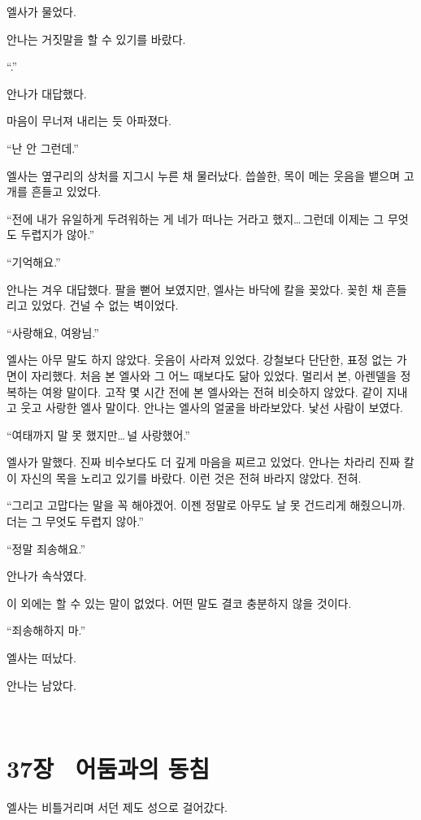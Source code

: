엘사가 물었다.

안나는 거짓말을 할 수 있기를 바랐다.

``.''

안나가 대답했다.

마음이 무너져 내리는 듯 아파졌다.

``난 안 그런데.''

엘사는 옆구리의 상처를 지그시 누른 채 물러났다. 씁쓸한, 목이 메는 웃음을 뱉으며 고개를 흔들고 있었다.

``전에 내가 유일하게 두려워하는 게 네가 떠나는 거라고 했지\ldots\,그런데 이제는 그 무엇도 두렵지가 않아.''

``기억해요.''

안나는 겨우 대답했다. 팔을 뻗어 보였지만, 엘사는 바닥에 칼을 꽂았다. 꽂힌 채 흔들리고 있었다. 건널 수 없는 벽이었다.

``사랑해요, 여왕님.''

엘사는 아무 말도 하지 않았다. 웃음이 사라져 있었다. 강철보다 단단한, 표정 없는 가면이 자리했다. 처음 본 엘사와 그 어느 때보다도 닮아 있었다. 멀리서 본, 아렌델을 정복하는 여왕 말이다. 고작 몇 시간 전에 본 엘사와는 전혀 비슷하지 않았다. 같이 지내고 웃고 사랑한 엘사 말이다. 안나는 엘사의 얼굴을 바라보았다. 낯선 사람이 보였다.

``여태까지 말 못 했지만\ldots\,널 사랑했어.''

엘사가 말했다. 진짜 비수보다도 더 깊게 마음을 찌르고 있었다. 안나는 차라리 진짜 칼이 자신의 목을 노리고 있기를 바랐다. 이런 것은 전혀 바라지 않았다. 전혀.

``그리고 고맙다는 말을 꼭 해야겠어. 이젠 정말로 아무도 날 못 건드리게 해줬으니까. 더는 그 무엇도 두렵지 않아.''

``정말 죄송해요.''

안나가 속삭였다.

이 외에는 할 수 있는 말이 없었다. 어떤 말도 결코 충분하지 않을 것이다.

``죄송해하지 마.''

엘사는 떠났다.

안나는 남았다.

﻿

\chapter[37장  어둠과의 동침][37장\hspace*{.5em}어둠과의 동침]{37장 \ 어둠과의 동침}



엘사는 비틀거리며 서던 제도 성으로 걸어갔다.

